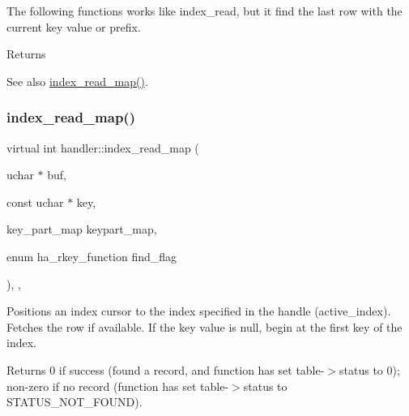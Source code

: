 The following functions works like index\+\_\+read, but it find the last row with the current key value or prefix. 

\begin{DoxyReturn}{Returns}

\end{DoxyReturn}
\begin{DoxySeeAlso}{See also}
\mbox{\hyperlink{classhandler_af8c2b258691e5baac8dd22d19c084b37}{index\+\_\+read\+\_\+map()}}. 
\end{DoxySeeAlso}
\mbox{\label{classhandler_af8c2b258691e5baac8dd22d19c084b37}} 
\subsubsection{\texorpdfstring{index\+\_\+read\+\_\+map()}{index\_read\_map()}}
{\footnotesize\ttfamily virtual int handler\+::index\+\_\+read\+\_\+map (\begin{DoxyParamCaption}\item[{uchar $\ast$}]{buf,  }\item[{const uchar $\ast$}]{key,  }\item[{key\+\_\+part\+\_\+map}]{keypart\+\_\+map,  }\item[{enum ha\+\_\+rkey\+\_\+function}]{find\+\_\+flag }\end{DoxyParamCaption})\hspace{0.3cm}{\ttfamily [inline]}, {\ttfamily [protected]}, {\ttfamily [virtual]}}



Positions an index cursor to the index specified in the handle (\textquotesingle{}active\+\_\+index\textquotesingle{}). Fetches the row if available. If the key value is null, begin at the first key of the index. 

\begin{DoxyReturn}{Returns}
0 if success (found a record, and function has set table-\/$>$status to 0); non-\/zero if no record (function has set table-\/$>$status to S\+T\+A\+T\+U\+S\+\_\+\+N\+O\+T\+\_\+\+F\+O\+U\+ND). 
\end{DoxyReturn}
\mbox{\label{classhandler_a5575d58c0acbb1924f7f3d3eb756612a}} 
